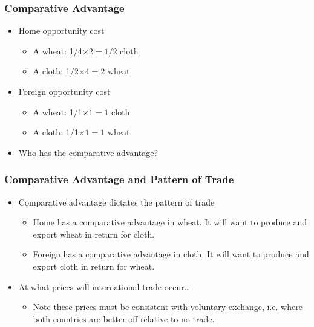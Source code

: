 \documentclass[handout]{beamer}
\begin{document}
\begin{frame}[t]
\frametitle{Comparative Advantage}
\bigskip
\begin{itemize}
\item Home opportunity cost
\begin{itemize}
\medskip
\item A wheat: 1/4$\times2 = 1/2$ cloth
\medskip
\item A cloth: 1/2$\times4 = 2$ wheat
\end{itemize}
\bigskip
\item Foreign opportunity cost
\begin{itemize}
\medskip
\item A wheat: 1/1$\times1 = 1$ cloth
\medskip
\item A cloth: 1/1$\times1 = 1$ wheat
\end{itemize}
\bigskip
\item Who has the comparative advantage?
\end{itemize}
\bigskip
\end{frame}


\begin{frame}[t]
\frametitle{Comparative Advantage and Pattern of Trade}
\bigskip
\begin{itemize}
\item Comparative advantage dictates the pattern of trade
\begin{itemize}
\medskip
\item Home has a comparative advantage in wheat. It will want to produce and export wheat in return for cloth.
\medskip
\item Foreign has a comparative advantage in cloth. It will want to produce and export cloth in return for wheat.
\end{itemize}
\bigskip
\item At what prices will international trade occur\ldots
\begin{itemize}
\medskip
\item Note these prices must be consistent with voluntary exchange, i.e. where both countries are better off relative to no trade.
\end{itemize}
\end{itemize}
\end{frame}
\end{document}
